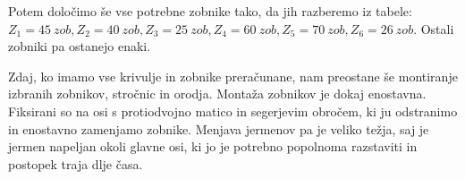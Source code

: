 Potem določimo še vse potrebne zobnike tako, da jih razberemo iz tabele: \\
\(Z_1 = 45\ zob, Z_2 = 40\ zob, Z_3 = 25\ zob, Z_4 = 60\ zob, Z_5 = 70\ zob, Z_6 = 26\ zob\).
Ostali zobniki pa ostanejo enaki.

Zdaj, ko imamo vse krivulje in zobnike preračunane, nam preostane še montiranje izbranih
zobnikov, stročnic in orodja. Montaža zobnikov je dokaj enostavna.
Fiksirani so na osi s protiodvojno matico in segerjevim obročem,
ki ju odstranimo in enostavno zamenjamo zobnike. Menjava jermenov pa je veliko težja, saj je jermen napeljan okoli glavne osi,
ki jo je potrebno popolnoma razstaviti in postopek traja dlje časa.